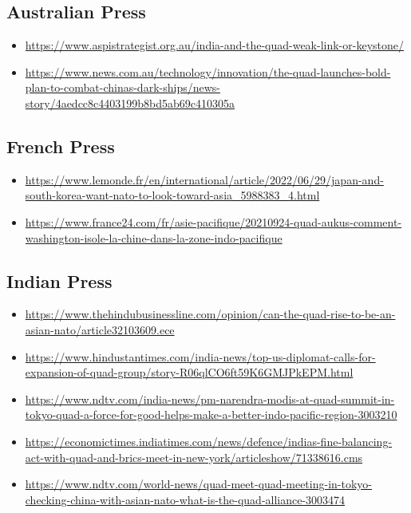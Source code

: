 \documentclass[11pt,a4paper]{article}
\begin{document}
\subsection*{Australian Press}
  \begin{itemize}[leftmargin=1.3em,itemsep=.18em,topsep=.25em]
    \item \url{https://www.aspistrategist.org.au/india-and-the-quad-weak-link-or-keystone/}
    \item \url{https://www.news.com.au/technology/innovation/the-quad-launches-bold-plan-to-combat-chinas-dark-ships/news-story/4aedcc8c4403199b8bd5ab69c410305a}
  \end{itemize}
\subsection*{French Press}
  \begin{itemize}[leftmargin=1.3em,itemsep=.18em,topsep=.25em]
    \item \url{https://www.lemonde.fr/en/international/article/2022/06/29/japan-and-south-korea-want-nato-to-look-toward-asia_5988383_4.html}
    \item \url{https://www.france24.com/fr/asie-pacifique/20210924-quad-aukus-comment-washington-isole-la-chine-dans-la-zone-indo-pacifique}
  \end{itemize}
\subsection*{Indian Press}
  \begin{itemize}[leftmargin=1.3em,itemsep=.18em,topsep=.25em]
    \item \url{https://www.thehindubusinessline.com/opinion/can-the-quad-rise-to-be-an-asian-nato/article32103609.ece}
    \item \url{https://www.hindustantimes.com/india-news/top-us-diplomat-calls-for-expansion-of-quad-group/story-R06qlCO6ft59K6GMJPkEPM.html}
    \item \url{https://www.ndtv.com/india-news/pm-narendra-modis-at-quad-summit-in-tokyo-quad-a-force-for-good-helps-make-a-better-indo-pacific-region-3003210}
    \item \url{https://economictimes.indiatimes.com/news/defence/indias-fine-balancing-act-with-quad-and-brics-meet-in-new-york/articleshow/71338616.cms}
    \item \url{https://www.ndtv.com/world-news/quad-meet-quad-meeting-in-tokyo-checking-china-with-asian-nato-what-is-the-quad-alliance-3003474}
  \end{itemize}
\end{document}
